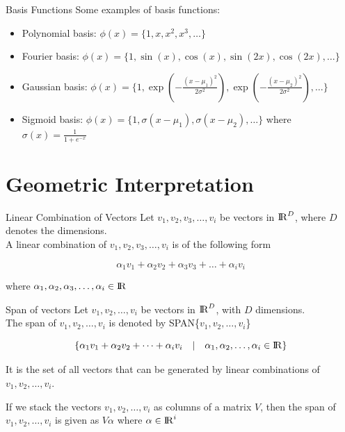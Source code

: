 \documentclass{beamer}
\begin{document}
\begin{frame}{Basis Functions}
    Some examples of basis functions:
    \begin{itemize}
        \item Polynomial basis: $\phi(x) = \{1, x, x^2, x^3, \dots\}$
        \item Fourier basis: $\phi(x) = \{1, \sin(x), \cos(x), \sin(2x), \cos(2x), \dots\}$
        \item Gaussian basis: $\phi(x) = \{1, \exp(-\frac{(x-\mu_1)^2}{2\sigma^2}), \exp(-\frac{(x-\mu_2)^2}{2\sigma^2}), \dots\}$
        \item Sigmoid basis: $\phi(x) = \{1, \sigma(x-\mu_1), \sigma(x-\mu_2), \dots\}$ where $\sigma(x) = \frac{1}{1+e^{-x}}$
    \end{itemize}
    
    
\end{frame}

\section{Geometric Interpretation}
\begin{frame}{Linear Combination of Vectors}
    Let $v_{1},v_{2},v_{3},\dots,v_{i}$ be vectors in  ${\rm I\!R}^{D}$, where $D$ denotes the dimensions. \pause \\A linear combination of $v_{1},v_{2},v_{3},\dots,v_{i}$ is of the following form
    
    \pause \begin{equation*}
        \alpha_{1}v_{1}+			\alpha_{2}v_{2}+			\alpha_{3}v_{3}+
        \dots+\alpha_{i}v_{i}
    \end{equation*}
    
    where $\alpha_{1},\alpha_{2},\alpha_{3},\dots,\alpha_{i} \in {\rm I\!R}$
    
\end{frame}

\begin{frame}{Span of vectors}
    Let $v_{1},v_{2},\dots,v_{i}$ be vectors in  ${\rm I\!R}^{D}$, with $D$ dimensions. \\
    \pause The span of  $v_{1},v_{2},\dots,v_{i}$ is denoted by SPAN\{$v_{1},v_{2},\dots,v_{i} $\}
    
    \pause \begin{equation*}
    \{	\alpha_{1}v_{1}+			\alpha_{2}v_{2}+
    \dots+\alpha_{i}v_{i} \hspace{1em}\vert \hspace{1em}  \alpha_{1},\alpha_{2},\dots,\alpha_{i} \in {\rm I\!R}\}
    \end{equation*}
    
    \pause  It is the set of all vectors that can be generated by linear combinations of $v_{1},v_{2},\dots,v_{i}$.

    \pause If we stack the vectors $v_{1},v_{2},\dots,v_{i}$ as columns of a matrix $V$, then the span of $v_{1},v_{2},\dots,v_{i}$ is given as $V\alpha$ where $\alpha \in {\rm I\!R}^{i}$
\end{frame}
\end{document}
